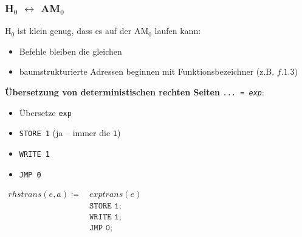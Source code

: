 \documentclass{beamer}
\begin{document}
\begin{frame} \frametitle{H${}_\text{0}$ $\leftrightarrow$ AM${}_\text{0}$}
	\footnotesize
	H${}_\text{0}$ ist klein genug, dass es auf der AM${}_\text{0}$ laufen kann:
	\begin{itemize}
		\item Befehle bleiben die gleichen
		\item baumstrukturierte Adressen beginnen mit Funktionsbezeichner (z.B. $f.1.3$)
	\end{itemize}
	\pause
	
	\textbf{Übersetzung von deterministischen rechten Seiten} \texttt{... = \textit{exp}}: 
	
	\begin{minipage}{\dimexpr0.5\linewidth-\fboxrule-\fboxsep}
		\begin{itemize}
			\item Übersetze \texttt{exp}
			\item \texttt{STORE 1} \hspace{2em} (ja -- immer die \texttt{1})
			\item \texttt{WRITE 1}
			\item \texttt{JMP 0}
		\end{itemize}
	\end{minipage}
	\begin{minipage}{\dimexpr0.5\linewidth-\fboxrule-\fboxsep}
		\hfill$\begin{aligned}
			rhstrans(e, a) \coloneqq \,
			&exptrans(e) \\
			&\texttt{STORE 1;} \\
			&\texttt{WRITE 1;} \\
			&\texttt{JMP 0;} \\
		\end{aligned}$
	\end{minipage}
\end{frame}
\end{document}

